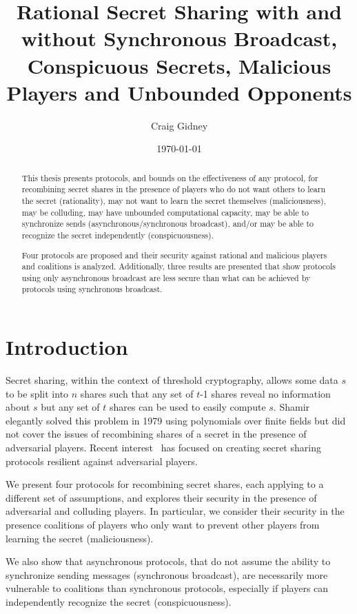 \documentclass{dalcsthesis}
\title{Rational Secret Sharing with and without Synchronous Broadcast, Conspicuous Secrets, Malicious Players and Unbounded Opponents}
\author{Craig Gidney}
\date{\today}
\begin{document}
\mcs
\maketitle

\begin{abstract}
This thesis presents protocols, and bounds on the effectiveness of any protocol, for recombining secret shares in the presence of players who do not want others to learn the secret (rationality), may not want to learn the secret themselves (maliciousness), may be colluding, may have unbounded computational capacity, may be able to synchronize sends (asynchronous/synchronous broadcast), and/or may be able to recognize the secret independently (conspicuousness).

Four protocols are proposed and their security against rational and malicious players and coalitions is analyzed. Additionally, three results are presented that show protocols using only asynchronous broadcast are less secure than what can be achieved by protocols using synchronous broadcast. 
\end{abstract}

\chapter{Introduction}

Secret sharing, within the context of threshold cryptography, allows some data $s$ to be split into $n$ shares such that any set of $t$-1 shares reveal no information about $s$ but any set of $t$ shares can be used to easily compute $s$. Shamir~\cite{shamir79} elegantly solved this problem in 1979 using polynomials over finite fields but did not cover the issues of recombining shares of a secret in the presence of adversarial players. Recent interest~\cite{abraham06, fuch10, gordon06, kol08, maleka08, ong09} has focused on creating secret sharing protocols resilient against adversarial players.

We present four protocols for recombining secret shares, each applying to a different set of assumptions, and explores their security in the presence of adversarial and colluding players. In particular, we consider their security in the presence coalitions of players who only want to prevent other players from learning the secret (maliciousness).

We also show that asynchronous protocols, that do not assume the ability to synchronize sending messages (synchronous broadcast), are necessarily more vulnerable to coalitions than synchronous protocols, especially if players can independently recognize the secret (conspicuousness).
\end{document}
